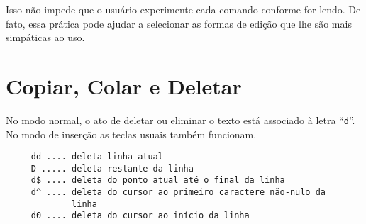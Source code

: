 Isso não impede que o usuário experimente cada comando conforme for lendo.
De fato, essa prática pode ajudar a selecionar as formas de edição que lhe
são mais simpáticas ao uso.

\section{Copiar, Colar e Deletar}\label{sec:CopiarColarEDeletar}
No modo normal, o ato de deletar ou eliminar o texto está associado
à letra ``\verb|d|''. No modo de inserção as teclas usuais também 
funcionam.

%
\begin{verbatim}
     dd .... deleta linha atual
     D ..... deleta restante da linha
     d$ .... deleta do ponto atual até o final da linha
     d^ .... deleta do cursor ao primeiro caractere não-nulo da 
             linha
     d0 .... deleta do cursor ao início da linha
\end{verbatim}
%
%
